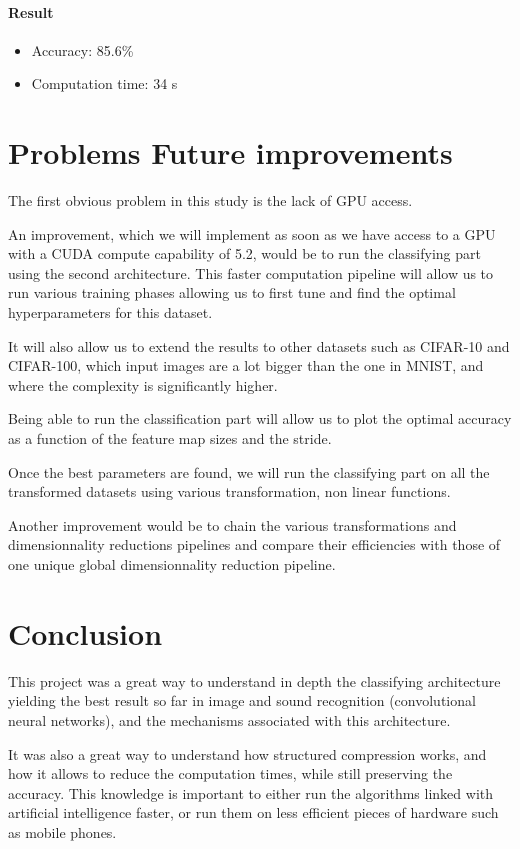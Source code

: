 \documentclass[11pt,a4paper]{article}
\begin{document}
		\paragraph{Result}
		\begin{itemize}
			\item Accuracy: 85.6\%
			\item Computation time: 34 s
		\end{itemize}
		
		
	
	
	\section{Problems Future improvements}
	The first obvious problem in this study is the lack of GPU access.
	
	
	An improvement, which we will implement as soon as we have access to a GPU with a CUDA compute capability of 5.2, would be to run the classifying part using the second architecture.
	This faster computation pipeline will allow us to run various training phases allowing us to first tune and find the optimal hyperparameters for this dataset.
	
	
	It will also allow us to extend the results to other datasets such as CIFAR-10 and CIFAR-100, which input images are a lot bigger than the one in MNIST, and where the complexity is significantly higher.
	
	
	Being able to run the classification part will allow us to plot the optimal accuracy as a function of the feature map sizes and the stride.
	
	
Once the best parameters are found, we will run the classifying part on all the transformed datasets using various transformation, non linear functions.
	
	Another improvement would be to chain the various transformations and dimensionnality reductions pipelines and compare their efficiencies with those of one unique global dimensionnality reduction pipeline.
	
	
	\section{Conclusion}
This project was a great way to understand in depth the classifying architecture yielding the best result so far in image and sound recognition (convolutional neural networks), and the mechanisms associated with this architecture.

It was also a great way to understand how structured compression works, and how it allows to reduce the computation times, while still preserving the accuracy. This knowledge is important to either run the algorithms linked with artificial intelligence faster, or run them on less efficient pieces of hardware such as mobile phones.
\end{document}
